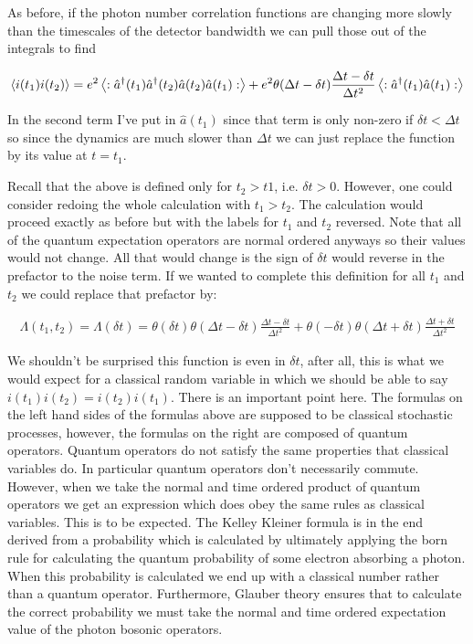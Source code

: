 \documentclass[12pt]{article}
\begin{document}
As before, if the photon number correlation functions are changing more slowly than the timescales of the detector bandwidth we can pull those out of the integrals to find

\begin{equation}
\braket{i(t_1)i(t_2)} = e^2\left<:\hat{a}^{\dag}(t_1)\hat{a}^{\dag}(t_2)\hat{a}(t_2)\hat{a}(t_1):\right> + e^2\theta(\Delta t -\delta t)\frac{\Delta t - \delta t}{\Delta t^2} \left<:\hat{a}^{\dag}(t_1)\hat{a}(t_1):\right>
\end{equation}

In the second term I've put in $\hat{a}(t_1)$ since that term is only non-zero if $\delta t<\Delta t$ so since the dynamics are much slower than $\Delta t$ we can just replace the function by its value at $t=t_1$.

Recall that the above is defined only for $t_2>t1$, i.e. $\delta t>0$. However, one could consider redoing the whole calculation with $t_1>t_2$. The calculation would proceed exactly as before but with the labels for $t_1$ and $t_2$ reversed.  Note that all of the quantum expectation operators are normal ordered anyways so their values would not change. All that would change is the sign of $\delta t$ would reverse in the prefactor to the noise term. If we wanted to complete this definition for all $t_1$ and $t_2$ we could replace that prefactor by:

\begin{align}
\Lambda(t_1,t_2) = \Lambda(\delta t) = \theta(\delta t) \theta(\Delta t-\delta t)\frac{\Delta t - \delta t}{\Delta t^2} + \theta(-\delta t) \theta(\Delta t + \delta t) \frac{\Delta t + \delta t}{\Delta t^2}
\end{align}

We shouldn't be surprised this function is even in $\delta t$, after all, this is what we would expect for a classical random variable in which we should be able to say $i(t_1)i(t_2) = i(t_2)i(t_1)$. There is an important point here. The formulas on the left hand sides of the formulas above are supposed to be classical stochastic processes, however, the formulas on the right are composed of quantum operators. Quantum operators do not satisfy the same properties that classical variables do. In particular quantum operators don't necessarily commute. However, when we take the normal and time ordered product of quantum operators we get an expression which does obey the same rules as classical variables. This is to be expected. The Kelley Kleiner formula is in the end derived from a probability which is calculated by ultimately applying the born rule for calculating the quantum probability of some electron absorbing a photon. When this probability is calculated we end up with a classical number rather than a quantum operator. Furthermore, Glauber theory ensures that to calculate the correct probability we must take the normal and time ordered expectation value of the photon bosonic operators.
\end{document}

